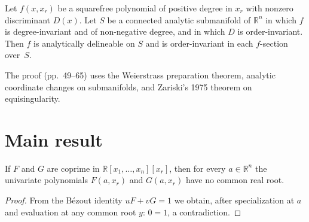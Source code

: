 \begin{theorem}
  \label{thm:lifting_theorem}
  \leanok
  Let $f(x, x_r)$ be a squarefree polynomial of positive degree in $x_r$
  with nonzero discriminant $D(x)$.  Let $S$ be a connected analytic submanifold of
  $\mathbb{R}^n$ in which $f$ is degree-invariant and of non-negative degree, and in
  which $D$ is order-invariant.  Then $f$ is analytically delineable on $S$ and is
  order-invariant in each $f$-section over~$S$.

  The proof (pp.~49--65) uses the Weierstrass preparation theorem, analytic
  coordinate changes on submanifolds, and Zariski's 1975 theorem on equisingularity.
\end{theorem}


\section{Main result}

\begin{theorem}
  \label{thm:no_common_root_of_coprime}
  \leanok
  If $F$ and $G$ are coprime in $\mathbb{R}[x_1,\ldots,x_n][x_r]$, then for
  every $a \in \mathbb{R}^n$ the univariate polynomials $F(a, x_r)$ and $G(a, x_r)$
  have no common real root.
\end{theorem}
\begin{proof}
  \leanok
  From the B\'ezout identity $u F + v G = 1$ we obtain, after specialization at $a$
  and evaluation at any common root $y$: $0 = 1$, a contradiction.
\end{proof}

